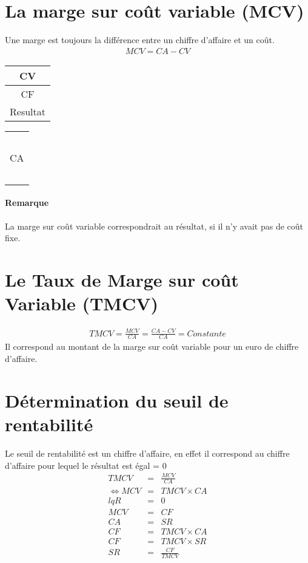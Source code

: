 \documentclass[12pt,a4paper,openany]{report}
\begin{document}
	\section{La marge sur coût variable (MCV)}
	Une marge est toujours la différence entre un chiffre d'affaire et un coût. 
	\begin{eqnarray*}
		MCV = CA - CV
	\end{eqnarray*}
	\begin{center}
	\begin{tabular}{|c|}
		\hline
	CV      \\
		\hline
	CF  \\
		\hline
	Resultat\\ 
		\hline
	\end{tabular}
	\hspace{1cm}
	\begin{tabular}{|c|}
		\hline
		~ \\	
		CA \\
		~ 	\\
		\hline
	\end{tabular}
	\end{center}
	\paragraph{Remarque} La marge sur coût variable correspondrait au résultat, si il n'y avait pas de coût fixe. 
	\section{Le Taux de Marge sur coût Variable (TMCV)} 
	\begin{eqnarray*}
		TMCV = \frac{MCV}{CA} = \frac{CA - CV}{CA} = Constante
	\end{eqnarray*}
	Il correspond au montant de la marge sur coût variable pour un euro de chiffre d'affaire. 
	\section{Détermination du seuil de rentabilité}
	Le seuil de rentabilité est un chiffre d'affaire, en effet il correspond au chiffre d'affaire pour lequel le résultat est égal = 0
	\begin{eqnarray*}
		TMCV &=& \frac{MCV}{CA}\\
		\Leftrightarrow MCV &=& TMCV \times CA\\
		lqR &=& 0\\
		MCV &=& CF\\
		CA &=& SR\\
		CF &=& TMCV \times CA\\
		CF &=& TMCV \times SR\\
		SR &=& \frac{CF}{TMCV}\\
	\end{eqnarray*}
\end{document}
